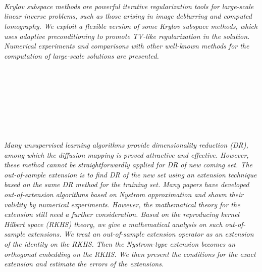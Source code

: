 \begin{multicols}{2}
\\ 
      \\
      \\\\
      \\
      \\\\
\\
    \textit{Krylov subspace methods are powerful iterative regularization tools for large-scale linear inverse problems, such as those arising in image deblurring and computed tomography. We exploit a flexible version of some Krylov subspace methods, which uses adaptive preconditioning to promote TV-like regularization in the solution. Numerical experiments and comparisons with other well-known methods for the computation of large-scale solutions are presented. }\\
\\ 
      \\
      \\\\
      \\
      \\\\
\\
    \textit{ Many unsupervised learning algorithms provide dimensionality reduction (DR), among which the diffusion mapping is proved attractive and effective. However, these method cannot be straightforwardly applied for DR of new coming set. The out-of-sample extension is to find DR of the new set using an extension technique based on the same DR method for the training set. Many papers have developed out-of-extension algorithms based on Nystrom approximation and shown their validity by numerical experiments. However, the mathematical theory for the extension still need a further consideration.  Based on the reproducing kernel Hilbert space (RKHS) theory, we give a mathematical analysis on such out-of-sample extensions. We treat an out-of-sample extension operator as an extension of the identity on the RKHS. Then the Nystrom-type extension becomes an orthogonal embedding on the RKHS. We then present the conditions for the exact extension and estimate the errors of the extensions.}\\
\\ 
      \\

\end{multicols}
